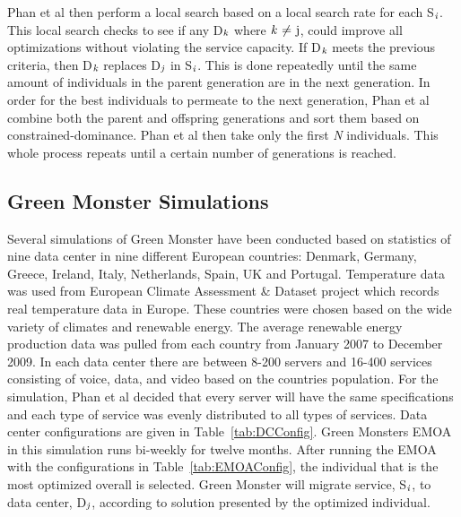 \documentclass{sig-alternate}
\begin{document}
Phan et al then perform a local search based on a local search rate
for each S$_{\text{\emph{i}}}$. This local search checks to see if any D$_{\text{\emph{k}}}$ where ${\text{\emph{k} ${\neq}$ j}}$, could improve all optimizations without violating the service capacity. If D$_{\text{\emph{k}}}$ meets the previous criteria, then D$_{\text{\emph{k}}}$ replaces D$_{\text{\emph{j}}}$ in S$_{\text{\emph{i}}}$. This is done repeatedly until the same amount of individuals in the parent generation are in the next generation. In order for the best individuals to permeate to the next generation, Phan et al combine both the parent and offspring generations and sort them based on constrained-dominance. Phan et al then take only the first \emph{N} individuals. This whole process repeats until a certain number of generations is reached. 

\subsection{Green Monster Simulations}
\label{sec:GMSims}
 
Several simulations of Green Monster have been conducted based on statistics of nine data center in nine different European countries: Denmark, Germany, Greece, Ireland, Italy, Netherlands, Spain, UK and Portugal. Temperature data was used from European Climate Assessment \& Dataset project which records real temperature data in Europe. These countries were chosen based on the wide variety of climates and renewable energy. The average renewable energy production data was pulled from each country from January 2007 to December 2009. In each data center there are between 8-200 servers and 16-400 services consisting of voice, data, and video based on the countries population. For the simulation, Phan et al decided that every server will have the same specifications and each type of service was evenly distributed to all types of services. Data center configurations are given in Table~\ref{tab:DCConfig}.  Green Monsters EMOA in this simulation runs bi-weekly for twelve months. After running the EMOA with the configurations in Table~\ref{tab:EMOAConfig}, the individual that is the most optimized overall is selected. Green Monster will migrate service, S$_{\text{\emph{i}}}$, to data center, D$_{\text{\emph{j}}}$, according to solution presented by the optimized individual.
\end{document}
